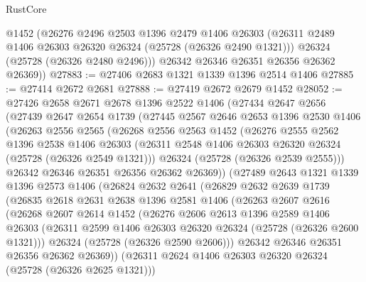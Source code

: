 \begin{lexlean}{RustCore}
\begin{coremodule}
        @1452
        (@26276
          @2496
          @2503
          @1396
          @2479
          @1406
          @26303
          (@26311 @2489 @1406 @26303 @26320 @26324 (@25728 (@26326 @2490 @1321)))
          @26324
          (@25728 (@26326 @2480 @2496)))
        @26342
        @26346
        @26351
        @26356
        @26362
        @26369))
@27883 := @27406 @2683 @1321 @1339 @1396 @2514 @1406
@27885 := @27414 @2672 @2681
@27888 := @27419 @2672 @2679 @1452
@28052 := @27426
    @2658
    @2671
    @2678
    @1396
    @2522
    @1406
    (@27434
      @2647
      @2656
      (@27439
        @2647
        @2654
        @1739
        (@27445
          @2567
          @2646
          @2653
          @1396
          @2530
          @1406
          (@26263
            @2556
            @2565
            (@26268
              @2556
              @2563
              @1452
              (@26276
                @2555
                @2562
                @1396
                @2538
                @1406
                @26303
                (@26311 @2548 @1406 @26303 @26320 @26324 (@25728 (@26326 @2549 @1321)))
                @26324
                (@25728 (@26326 @2539 @2555)))
              @26342
              @26346
              @26351
              @26356
              @26362
              @26369))
          (@27489
            @2643
            @1321
            @1339
            @1396
            @2573
            @1406
            (@26824
              @2632
              @2641
              (@26829
                @2632
                @2639
                @1739
                (@26835
                  @2618
                  @2631
                  @2638
                  @1396
                  @2581
                  @1406
                  (@26263
                    @2607
                    @2616
                    (@26268
                      @2607
                      @2614
                      @1452
                      (@26276
                        @2606
                        @2613
                        @1396
                        @2589
                        @1406
                        @26303
                        (@26311 @2599 @1406 @26303 @26320 @26324 (@25728 (@26326 @2600 @1321)))
                        @26324
                        (@25728 (@26326 @2590 @2606)))
                      @26342
                      @26346
                      @26351
                      @26356
                      @26362
                      @26369))
                  (@26311 @2624 @1406 @26303 @26320 @26324 (@25728 (@26326 @2625 @1321)))

\end{coremodule}
\end{lexlean}
